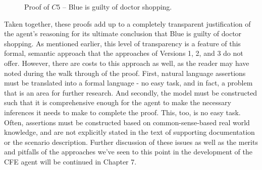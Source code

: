 \begin{figure}[h!] 
\vspace{6pt}
\label{fig:proof-of-c5}
\centering
{}
\caption{Proof of $C5$ -- Blue is guilty of doctor shopping.}
\end{figure}

Taken together, these proofs add up to a completely transparent justification of the agent's reasoning for its ultimate conclusion that Blue is guilty of doctor shopping.  As mentioned earlier, this level of transparency is a feature of this formal, semantic approach that the approaches of Versions 1, 2, and 3 do not offer.  However, there are costs to this approach as well, as the reader may have noted during the walk through of the proof.  First, natural language assertions must be translated into a formal language - no easy task, and in fact, a problem that is an area for further research.  And secondly, the model must be constructed such that it is comprehensive enough for the agent to make the necessary inferences it needs to make to complete the proof.  This, too, is no easy task.  Often, assertions must be constructed based on common-sense-based real world knowledge, and are not explicitly stated in the text of supporting documentation or the scenario description.  Further discussion of these issues as well as the merits and pitfalls of the approaches we've seen to this point in the development of the CFE agent will be continued in Chapter 7.



